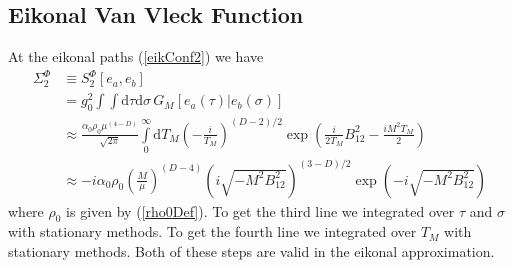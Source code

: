 \subsection{Eikonal Van Vleck Function}
At the eikonal paths (\ref{eikConf2}) we have
\begin{align}
	\Sigma_{2}^{\Phi} &\equiv S_{2}^{\Phi}\left[e_{a}, e_{b} \right] \nonumber \\
	&= g^{2}_{0} \int \int \mathrm{d}\tau \mathrm{d}\sigma \, G_{M} \left[ e_{a}(\tau) | e_{b}(\sigma) \right] \nonumber \\
	&\approx \frac{\alpha_{0} \rho_{0} \mu^{(4 - D)}}{\sqrt{2 \pi}} \int\limits_{0}^{\infty} \mathrm{d} T_{M} \left( - \frac{i}{T_{M}} \right)^{(D - 2)/2} \exp{\left( \frac{i}{2 T_{M}} B_{12}^{2} - \frac{i M^{2} T_{M}}{2} \right)} \nonumber \\
	&\approx {-i \alpha_{0} \rho_{0}} \left( \frac{M}{\mu} \right)^{(D - 4)} \left( i \sqrt{-M^{2} B_{12}^{2}} \right)^{(3 - D)/2} \exp{\left(- i \sqrt{-M^{2} B_{12}^{2}} \right)} \nonumber
\end{align}
where $\rho_{0}$ is given by (\ref{rho0Def}). To get the third line we integrated over $\tau$ and $\sigma$ with stationary methods. To get the fourth line we integrated over $T_{M}$ with stationary methods. Both of these steps are valid in the eikonal approximation.
